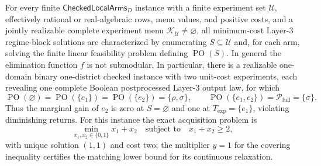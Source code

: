 For every finite \(\mathsf{CheckedLocalArms}_D\) instance with a finite experiment set \(\mathcal U\), effectively rational or real-algebraic rows, menu values, and positive costs, and a jointly realizable complete experiment menu \(\mathcal K_{\mathcal U}\ne\varnothing\), all minimum-cost Layer-3 regime-block solutions are characterized by enumerating \(S\subseteq\mathcal U\) and, for each arm, solving the finite linear feasibility problem defining \(\operatorname{PO}(S)\).  In general the elimination function \(f\) is not submodular.  In particular, there is a realizable one-domain binary one-district checked instance with two unit-cost experiments, each revealing one complete Boolean postprocessed Layer-3 output law, for which
\[
\operatorname{PO}(\varnothing)=\operatorname{PO}(\{e_1\})
=\operatorname{PO}(\{e_2\})=\{\rho,\sigma\},
\qquad
\operatorname{PO}(\{e_1,e_2\})=
\mathcal P_{\mathrm{full}}=\{\sigma\}.
\]
Thus the marginal gain of \(e_2\) is zero at \(S=\varnothing\) and one at \(T_{\mathrm{exp}}=\{e_1\}\), violating diminishing returns.  For this instance the exact acquisition problem is
\[
\min_{x_1,x_2\in\{0,1\}}x_1+x_2
\quad\text{subject to}\quad x_1+x_2\geq2,
\]
with unique solution \((1,1)\) and cost two; the multiplier \(y=1\) for the covering inequality certifies the matching lower bound for its continuous relaxation.